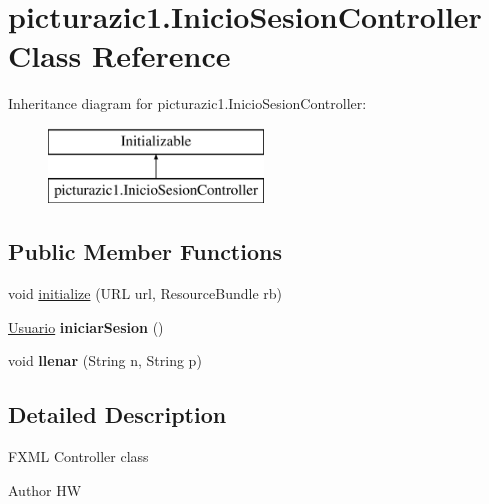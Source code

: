 \hypertarget{classpicturazic1_1_1_inicio_sesion_controller}{}\section{picturazic1.\+Inicio\+Sesion\+Controller Class Reference}
\label{classpicturazic1_1_1_inicio_sesion_controller}
Inheritance diagram for picturazic1.\+Inicio\+Sesion\+Controller\+:\begin{figure}[H]
\begin{center}
\leavevmode
\includegraphics[height=2.000000cm]{classpicturazic1_1_1_inicio_sesion_controller}
\end{center}
\end{figure}
\subsection*{Public Member Functions}
\begin{DoxyCompactItemize}
\item 
void \mbox{\hyperlink{classpicturazic1_1_1_inicio_sesion_controller_a879e972a8f81ff3e4edc41244d371a25}{initialize}} (U\+RL url, Resource\+Bundle rb)
\item 
\mbox{\label{classpicturazic1_1_1_inicio_sesion_controller_aeaf1ade35872452a404289bfedf208d1}} 
\mbox{\hyperlink{classmodelo_1_1_usuario}{Usuario}} {\bfseries iniciar\+Sesion} ()
\item 
\mbox{\label{classpicturazic1_1_1_inicio_sesion_controller_ae443843ad93c8690e2ead2c9c88c13a7}} 
void {\bfseries llenar} (String n, String p)
\end{DoxyCompactItemize}


\subsection{Detailed Description}
F\+X\+ML Controller class

\begin{DoxyAuthor}{Author}
HW 
\end{DoxyAuthor}


